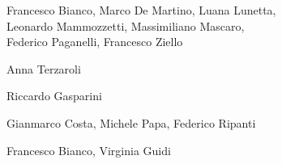 \medskip

\textbf{}

Francesco Bianco, Marco De Martino, Luana Lunetta, \\ Leonardo Mammozzetti,  Massimiliano Mascaro, \\ Federico Paganelli, Francesco Ziello

\medskip

\textbf{}

Anna Terzaroli

\medskip

\textbf{}

Riccardo Gasparini



\textbf{}

Gianmarco Costa, Michele Papa, Federico Ripanti

\medskip

\textbf{}

Francesco Bianco, Virginia Guidi

